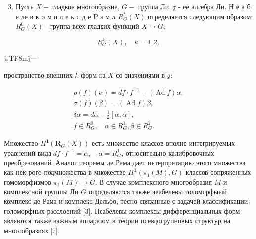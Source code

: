 \documentclass[10pt]{article}
\begin{document}
\begin{enumerate}

  \setcounter{enumi}{2}

  \item Пусть $X-$ гладкое многообразие, $G-$ группа Ли, $\mathfrak{x}$ - ее алгебра Ли. Н е а б е ле в к о м п л е к с д е $\mathrm{P}$ а м a $R_{G}^{*}(X)$ определяется следующим образом: $R_{G}^{0}(X)$ - группа всех гладких функций $X \rightarrow G$;

\end{enumerate}



\[

R_{G}^{k}(X), \quad k=1,2,

\]



\begin{CJK}{UTF8}{mj}一\end{CJK}пространство внешних $k$-форм на $X$ со значениями в $\mathfrak{g}$;



\[

\begin{gathered}

\rho(f)(\alpha)=d f \cdot f^{-1}+(\operatorname{Ad} f) \alpha ; \\

\sigma(f)(\beta)=(\operatorname{Ad} f) \beta, \\

\delta \alpha=d \alpha-\frac{1}{2}[\alpha, \alpha], \\

f \in R_{G}^{0}, \quad \alpha \in R_{G}^{1}, \beta \in R_{G}^{2} .

\end{gathered}

\]



Множество $H^{\mathbf{1}}\left(\boldsymbol{R}_{G}(X)\right)$ есть множество классов вполне интегрируемых уравнений вида $d f \cdot f^{-1}=\alpha, \quad \alpha=R_{G}^{1}$, относительно калибровочных преобразований. Аналог теоремы де Рама дает интерпретацию этого множества как нек-рого подмножества в множестве $H^{\mathbf{1}}\left(\pi_{1}(M), G\right)$ классов сопряженных гомоморфизмов $\pi_{1}(M) \rightarrow G$. В случае комплексного многообразия $M$ и комплексной групшы Ли $G$ определяются также неабелевы голоморфыый комплекс де Рама и комплекс Дольбо, тесно связанные с задачей классификации голоморфных расслоений [3]. Неабелевы комплексы дифференциальных форм являются также важным аппаратом в теории псевдогрупновых структур на многообразиях [7].
\end{document}
